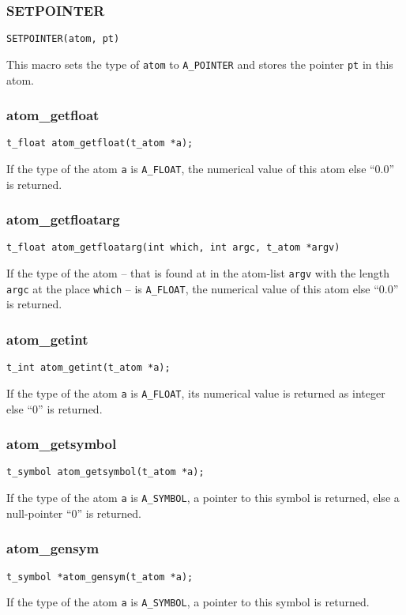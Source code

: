 \documentclass[12pt, a4paper,english,titlepage]{article}
\begin{document}
\begin{appendix}
\subsubsection{SETPOINTER}
\begin{verbatim}
SETPOINTER(atom, pt)
\end{verbatim}
This macro sets the type of \verb+atom+ to \verb+A_POINTER+
and stores the pointer \verb+pt+ in this atom.

\subsubsection{atom\_getfloat}
\begin{verbatim}
t_float atom_getfloat(t_atom *a);
\end{verbatim}
If the type of the atom \verb+a+ is \verb+A_FLOAT+,
the numerical value of this atom else ``0.0'' is returned.

\subsubsection{atom\_getfloatarg}
\begin{verbatim}
t_float atom_getfloatarg(int which, int argc, t_atom *argv)
\end{verbatim}
If the type of the atom -- that is found at in the atom-list
\verb+argv+ with the length \verb+argc+ at the place \verb+which+ --
is \verb+A_FLOAT+, the numerical value of this atom else ``0.0'' is returned.

\subsubsection{atom\_getint}
\begin{verbatim}
t_int atom_getint(t_atom *a);
\end{verbatim}
If the type of the atom \verb+a+ is \verb+A_FLOAT+,
its numerical value is returned as integer else ``0'' is returned.

\subsubsection{atom\_getsymbol}
\begin{verbatim}
t_symbol atom_getsymbol(t_atom *a);
\end{verbatim}
If the type of the atom \verb+a+ is \verb+A_SYMBOL+,
a pointer to this symbol is returned, else a null-pointer ``0'' is returned.

\subsubsection{atom\_gensym}
\begin{verbatim}
t_symbol *atom_gensym(t_atom *a);
\end{verbatim}
If the type of the atom \verb+a+ is \verb+A_SYMBOL+,
a pointer to this symbol is returned.


\end{appendix}
\end{document}
